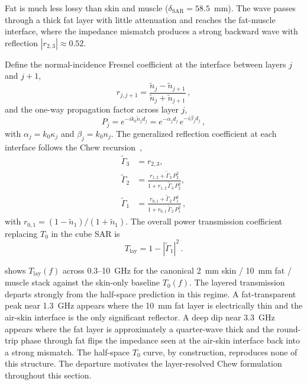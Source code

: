 \documentclass[journal,twocolumn,10pt]{IEEEtran}
\theoremstyle{plain}
\theoremstyle{remark}
\newcommand{\Tlay}{T_{\mathrm{lay}}}
\newcommand{\ntilde}{\tilde{n}}
\begin{document}
Fat is much less lossy than skin and muscle
($\delta_{\mathrm{SAR}} = 58.5$~mm). The wave passes through a thick
fat layer with little attenuation and reaches the fat-muscle
interface, where the impedance mismatch produces a strong backward
wave with reflection $|r_{2,3}| \approx 0.52$.

Define the normal-incidence Fresnel coefficient at the interface
between layers $j$ and $j+1$,
\begin{equation}\label{eq:rjj1-SI}
  r_{j,j+1} = \frac{\ntilde_j - \ntilde_{j+1}}{\ntilde_j + \ntilde_{j+1}}\, ,
\end{equation}
and the one-way propagation factor across layer $j$,
\begin{equation}\label{eq:Pj-SI}
  P_j = e^{-i k_0 \ntilde_j d_j} = e^{-\alpha_j d_j}\,e^{-i\beta_j d_j}\, ,
\end{equation}
with $\alpha_j = k_0\kappa_j$ and $\beta_j = k_0 n_j$. The
generalized reflection coefficient at each interface follows the
Chew recursion~\cite{Chew1995},
\begin{align}
  \widetilde\Gamma_3 &= r_{2,3},\label{eq:Gamma3-SI}\\
  \widetilde\Gamma_2 &= \frac{r_{1,2}
    + \widetilde\Gamma_3\,P_2^{2}}
    {1 + r_{1,2}\,\widetilde\Gamma_3\,P_2^{2}},
    \label{eq:Gamma2-SI}\\
  \widetilde\Gamma_1 &= \frac{r_{0,1}
    + \widetilde\Gamma_2\,P_1^{2}}
    {1 + r_{0,1}\,\widetilde\Gamma_2\,P_1^{2}}\, ,
    \label{eq:Gamma1-SI}
\end{align}
with $r_{0,1} = (1 - \ntilde_1)/(1 + \ntilde_1)$. The overall power
transmission coefficient replacing $T_0$ in the cube SAR is
\begin{equation}\label{eq:T-layered-SI}
  \Tlay = 1 - |\widetilde\Gamma_1|^2\, .
\end{equation}

 shows $\Tlay(f)$ across 0.3--10~GHz for
the canonical 2~mm skin / 10~mm fat / muscle stack against the
skin-only baseline $T_0(f)$. The layered transmission departs
strongly from the half-space prediction in this regime. A
fat-transparent peak near 1.3~GHz appears where the 10~mm fat
layer is electrically thin and the air-skin interface is the only
significant reflector. A deep dip near 3.3~GHz appears where the
fat layer is approximately a quarter-wave thick and the round-trip
phase through fat flips the impedance seen at the air-skin interface
back into a strong mismatch. The half-space $T_0$ curve, by
construction, reproduces none of this structure. The departure motivates the
layer-resolved Chew formulation throughout this section.
\end{document}
